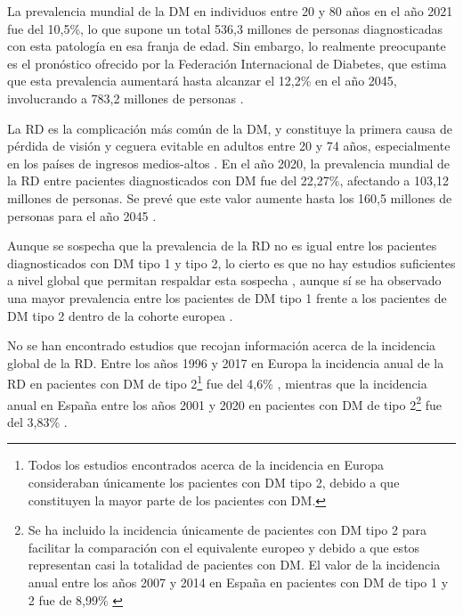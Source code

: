 La prevalencia mundial de la DM en individuos entre 20 y 80 años en el año 2021 fue del 10,5\%, lo que supone un total 536,3 millones de personas diagnosticadas con esta patología en esa franja de edad. Sin embargo, lo realmente preocupante es el pronóstico ofrecido por la Federación Internacional de Diabetes, que estima que esta prevalencia aumentará hasta alcanzar el 12,2\% en el año 2045, involucrando a 783,2 millones de personas \cite{diabetes:IDF}.

La RD es la complicación más común de la DM, y constituye la primera causa de pérdida de visión y ceguera evitable en adultos entre 20 y 74 años, especialmente en los países de ingresos medios-altos \cite{retinopatia:lancet}. En el año 2020, la prevalencia mundial de la RD entre pacientes diagnosticados con DM fue del 22,27\%, afectando a 103,12 millones de personas. Se prevé que este valor aumente hasta los 160,5 millones de personas para el año 2045 \cite{retinopatia:ophtalmology}.

Aunque se sospecha que la prevalencia de la RD no es igual entre los pacientes diagnosticados con DM tipo 1 y tipo 2, lo cierto es que no hay estudios suficientes a nivel global que permitan respaldar esta sospecha \cite{retinopatia:ophtalmology}, aunque sí se ha observado una mayor prevalencia entre los pacientes de DM tipo 1 frente a los pacientes de DM tipo 2 dentro de la cohorte europea \cite{retinopatia:por_tipos}. 

No se han encontrado estudios que recojan información acerca de la incidencia global de la RD. Entre los años 1996 y 2017 en Europa la incidencia anual de la RD en pacientes con DM de tipo 2\footnote{Todos los estudios encontrados acerca de la incidencia en Europa consideraban únicamente los pacientes con DM tipo 2, debido a que constituyen la mayor parte de los pacientes con DM.} fue del 4,6\% \cite{retinopatia:por_tipos}, mientras que la incidencia anual en España entre los años 2001 y 2020 en pacientes con DM de tipo 2\footnote{Se ha incluido la incidencia únicamente de pacientes con DM tipo 2 para facilitar la comparación con el equivalente europeo y debido a que estos representan casi la totalidad de pacientes con DM. El valor de la incidencia anual entre los años 2007 y 2014 en España en pacientes con DM de tipo 1 y 2 fue de 8,99\% \cite{retinopatia:espana}} fue del 3,83\% \cite{retinopatia_review:espana}.

\titlespacing{\subsubsection}{0pt}{0.25cm}{0.1cm}
